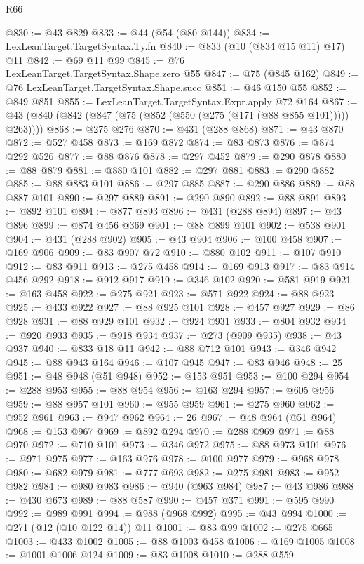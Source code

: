 \begin{lexlean}{R66}
\begin{coremodule}
@830 := @43 @829
@833 := @44 (@54 (@80 @144))
@834 := LexLeanTarget.TargetSyntax.Ty.fn
@840 := @833 (@10 (@834 @15 @11) @17) @11
@842 := @69 @11 @99
@845 := @76 LexLeanTarget.TargetSyntax.Shape.zero @55
@847 := @75 (@845 @162)
@849 := @76 LexLeanTarget.TargetSyntax.Shape.succ
@851 := @46 @150 @55
@852 := @849 @851
@855 := LexLeanTarget.TargetSyntax.Expr.apply @72 @164
@867 := @43 (@840 (@842 (@847 (@75 (@852 (@550 (@275 (@171 (@88 @855 @101))))) @263))))
@868 := @275 @276
@870 := @431 (@288 @868)
@871 := @43 @870
@872 := @527 @458
@873 := @169 @872
@874 := @83 @873
@876 := @874 @292 @526
@877 := @88 @876
@878 := @297 @452
@879 := @290 @878
@880 := @88 @879
@881 := @880 @101
@882 := @297 @881
@883 := @290 @882
@885 := @88 @883 @101
@886 := @297 @885
@887 := @290 @886
@889 := @88 @887 @101
@890 := @297 @889
@891 := @290 @890
@892 := @88 @891
@893 := @892 @101
@894 := @877 @893
@896 := @431 (@288 @894)
@897 := @43 @896
@899 := @874 @456 @369
@901 := @88 @899 @101
@902 := @538 @901
@904 := @431 (@288 @902)
@905 := @43 @904
@906 := @100 @458
@907 := @169 @906
@909 := @83 @907 @72
@910 := @880 @102
@911 := @107 @910
@912 := @83 @911
@913 := @275 @458
@914 := @169 @913
@917 := @83 @914 @456 @292
@918 := @912 @917
@919 := @346 @102
@920 := @581 @919
@921 := @163 @458
@922 := @275 @921
@923 := @571 @922
@924 := @88 @923
@925 := @433 @922
@927 := @88 @925 @101
@928 := @457 @927
@929 := @86 @928
@931 := @88 @929 @101
@932 := @924 @931
@933 := @804 @932
@934 := @920 @933
@935 := @918 @934
@937 := @273 (@909 @935)
@938 := @43 @937
@940 := @833 @18 @11
@942 := @88 @712 @101
@943 := @346 @942
@945 := @88 @943 @164
@946 := @107 @945
@947 := @83 @946
@948 := 25
@951 := @48 @948 (@51 @948)
@952 := @153 @951
@953 := @100 @294
@954 := @288 @953
@955 := @88 @954
@956 := @163 @294
@957 := @605 @956
@959 := @88 @957 @101
@960 := @955 @959
@961 := @275 @960
@962 := @952 @961
@963 := @947 @962
@964 := 26
@967 := @48 @964 (@51 @964)
@968 := @153 @967
@969 := @892 @294
@970 := @288 @969
@971 := @88 @970
@972 := @710 @101
@973 := @346 @972
@975 := @88 @973 @101
@976 := @971 @975
@977 := @163 @976
@978 := @100 @977
@979 := @968 @978
@980 := @682 @979
@981 := @777 @693
@982 := @275 @981
@983 := @952 @982
@984 := @980 @983
@986 := @940 (@963 @984)
@987 := @43 @986
@988 := @430 @673
@989 := @88 @587
@990 := @457 @371
@991 := @595 @990
@992 := @989 @991
@994 := @988 (@968 @992)
@995 := @43 @994
@1000 := @271 (@12 (@10 @122 @14)) @11
@1001 := @83 @99
@1002 := @275 @665
@1003 := @433 @1002
@1005 := @88 @1003 @458
@1006 := @169 @1005
@1008 := @1001 @1006 @124
@1009 := @83 @1008
@1010 := @288 @559

\end{coremodule}
\end{lexlean}
